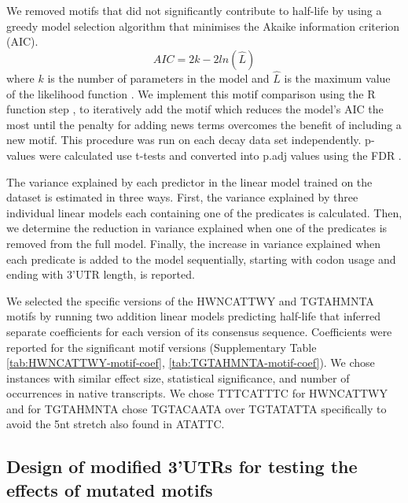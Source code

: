 \documentclass[../main.tex]{subfiles}
\begin{document}
We removed motifs that did not significantly contribute to half-life by using a greedy model selection algorithm that minimises the Akaike information criterion (AIC).
\[AIC = 2k - 2ln(\hat{L})\]
where \(k\) is the number of parameters in the model and \(\hat L\) is the maximum value of the likelihood function \parencite{Akaike1998}.
We implement this motif comparison using the R function step \parencite{Rstats,Ripley2002},
to iteratively add the motif which reduces the model's AIC the most until the penalty for adding news terms overcomes the benefit of including a new motif.
This procedure was run on each decay data set independently.
p-values were calculated use t-tests and converted into p.adj values using the FDR \parencite{Benjamini1995}.

The variance explained by each predictor in the linear model trained on the \parencite{Chan2018} dataset is estimated in three ways. First, the variance explained by three individual linear models each containing one of the predicates is calculated. Then, we determine the reduction in variance explained when one of the predicates is removed from the full model. Finally, the increase in variance explained when each predicate is added to the model sequentially, starting with codon usage and ending with 3'UTR length, is reported.

We selected the specific versions of the HWNCATTWY and TGTAHMNTA motifs by running two addition linear models predicting half-life that inferred separate coefficients for each version of its consensus sequence.
Coefficients were reported for the significant motif versions (Supplementary Table \ref{tab:HWNCATTWY-motif-coef}, \ref{tab:TGTAHMNTA-motif-coef}).
We chose instances with similar effect size, statistical significance, and number of occurrences in native transcripts.
We chose TTTCATTTC for HWNCATTWY and for TGTAHMNTA chose TGTACAATA over TGTATATTA specifically to avoid the 5nt stretch also found in ATATTC.

\subsection{Design of modified 3'UTRs for testing the effects of mutated motifs}
\end{document}
